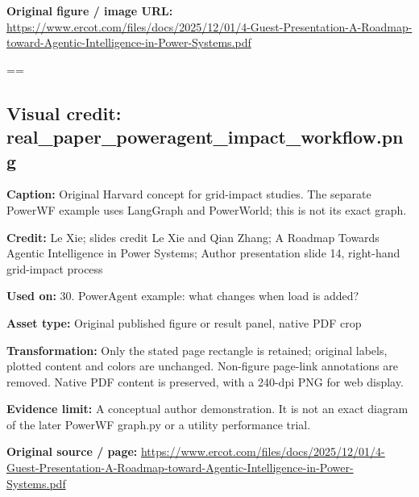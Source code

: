 \documentclass[10pt,letterpaper]{article}
\begin{document}
\textbf{Original figure / image URL:} \href{https://www.ercot.com/files/docs/2025/12/01/4-Guest-Presentation-A-Roadmap-toward-Agentic-Intelligence-in-Power-Systems.pdf}{\small\ttfamily https:/\allowbreak{}/\allowbreak{}www.\allowbreak{}ercot.\allowbreak{}com/\allowbreak{}files/\allowbreak{}docs/\allowbreak{}2025/\allowbreak{}12/\allowbreak{}01/\allowbreak{}4-\allowbreak{}Guest-\allowbreak{}Presentation-\allowbreak{}A-\allowbreak{}Roadmap-\allowbreak{}toward-\allowbreak{}Agentic-\allowbreak{}Intelligence-\allowbreak{}in-\allowbreak{}Power-\allowbreak{}Systems.\allowbreak{}pdf}\par
\egroup\par\noindent\box\readingEntry\par\medskip
\setbox\readingEntry=\vbox\bgroup\hsize=\linewidth\subsection*{Visual credit: real\_paper\_poweragent\_impact\_workflow.png}
\textbf{Caption:} Original Harvard concept for grid-impact studies. The separate PowerWF example uses LangGraph and PowerWorld; this is not its exact graph.\par
\textbf{Credit:} Le Xie; slides credit Le Xie and Qian Zhang; A Roadmap Towards Agentic Intelligence in Power Systems; Author presentation slide 14, right-hand grid-impact process\par
\textbf{Used on:} 30. PowerAgent example: what changes when load is added?\par
\textbf{Asset type:} Original published figure or result panel, native PDF crop\par
\textbf{Transformation:} Only the stated page rectangle is retained; original labels, plotted content and colors are unchanged. Non-figure page-link annotations are removed. Native PDF content is preserved, with a 240-dpi PNG for web display.\par
\textbf{Evidence limit:} A conceptual author demonstration. It is not an exact diagram of the later PowerWF graph.py or a utility performance trial.\par
\textbf{Original source / page:} \href{https://www.ercot.com/files/docs/2025/12/01/4-Guest-Presentation-A-Roadmap-toward-Agentic-Intelligence-in-Power-Systems.pdf}{\small\ttfamily https:/\allowbreak{}/\allowbreak{}www.\allowbreak{}ercot.\allowbreak{}com/\allowbreak{}files/\allowbreak{}docs/\allowbreak{}2025/\allowbreak{}12/\allowbreak{}01/\allowbreak{}4-\allowbreak{}Guest-\allowbreak{}Presentation-\allowbreak{}A-\allowbreak{}Roadmap-\allowbreak{}toward-\allowbreak{}Agentic-\allowbreak{}Intelligence-\allowbreak{}in-\allowbreak{}Power-\allowbreak{}Systems.\allowbreak{}pdf}\par
\end{document}
